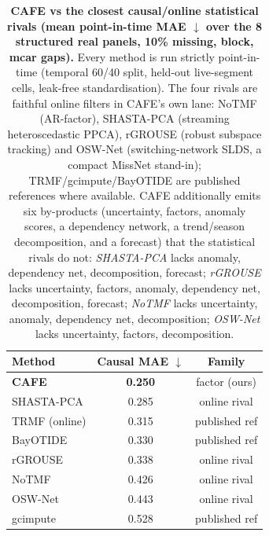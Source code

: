 \begin{table}[tbp]\centering\small
\setlength{\tabcolsep}{6pt}
\caption{\textbf{CAFE vs the closest causal/online statistical rivals (mean point-in-time MAE $\downarrow$ over the 8 structured real panels, 10\% missing, block, mcar gaps).} Every method is run strictly point-in-time (temporal 60/40 split, held-out live-segment cells, leak-free standardisation). The four rivals are faithful online filters in CAFE's own lane: NoTMF (AR-factor), SHASTA-PCA (streaming heteroscedastic PPCA), rGROUSE (robust subspace tracking) and OSW-Net (switching-network SLDS, a compact MissNet stand-in); TRMF/gcimpute/BayOTIDE are published references where available. CAFE additionally emits six by-products (uncertainty, factors, anomaly scores, a dependency network, a trend/season decomposition, and a forecast) that the statistical rivals do not: \emph{SHASTA-PCA} lacks anomaly, dependency net, decomposition, forecast; \emph{rGROUSE} lacks uncertainty, factors, anomaly, dependency net, decomposition, forecast; \emph{NoTMF} lacks uncertainty, anomaly, dependency net, decomposition; \emph{OSW-Net} lacks uncertainty, factors, decomposition.}
\label{tab:causalrivals}
\begin{tabular}{@{}lcc@{}}
\toprule
Method & Causal MAE $\downarrow$ & Family \\
\midrule
\textbf{CAFE} & \textbf{0.250} & factor (ours) \\
SHASTA-PCA & 0.285 & online rival \\
TRMF (online) & 0.315 & published ref \\
BayOTIDE & 0.330 & published ref \\
rGROUSE & 0.338 & online rival \\
NoTMF & 0.426 & online rival \\
OSW-Net & 0.443 & online rival \\
gcimpute & 0.528 & published ref \\
\bottomrule
\end{tabular}
\end{table}
